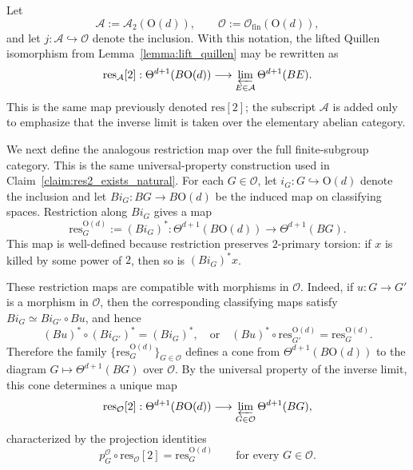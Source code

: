 \documentclass[aps,prx,reprint,superscriptaddress,twocolumn,amsmath,amssymb,amsfonts, nofootinbib]{revtex4-2}
\newcommand{\res}{\text{res}}
\theoremstyle{apsstyle}
\begin{document}
\noindent Let
\begin{equation}
\mathcal A:=\mathcal A_2(\mathrm{O}(d)), \qquad \mathcal O:=\mathcal O_{\mathrm{fin}}(\mathrm{O}(d)),
\end{equation}
and let $j:\mathcal A\hookrightarrow \mathcal O$ denote the inclusion. With this notation, the lifted Quillen isomorphism from Lemma~\ref{lemma:lift_quillen} may be rewritten as
\begin{equation}
\res_{\mathcal A}[2]: \Theta^{d+1}(B\mathrm{O}(d)) \longrightarrow \varprojlim_{E\in\mathcal A} \Theta^{d+1}(BE).
\end{equation}
This is the same map previously denoted $\res[2]$; the subscript $\mathcal A$ is added only to emphasize that the inverse limit is taken over the elementary abelian category.

\bigskip

We next define the analogous restriction map over the full finite-subgroup category. This is the same universal-property construction used in Claim~\ref{claim:res2_exists_natural}. For each $G\in\mathcal O$, let $i_G:G\hookrightarrow \mathrm{O}(d)$ denote the inclusion and let $Bi_G:BG\to B\mathrm{O}(d)$ be the induced map on classifying spaces. Restriction along $Bi_G$ gives a map
\begin{equation}
\res^{\mathrm{O}(d)}_{G}:=(Bi_G)^*: \Theta^{d+1}(B\mathrm{O}(d)) \longrightarrow \Theta^{d+1}(BG).
\end{equation}
This map is well-defined because restriction preserves $2$-primary torsion: if $x$ is killed by some power of $2$, then so is $(Bi_G)^*x$.

\noindent These restriction maps are compatible with morphisms in $\mathcal O$. Indeed, if $u:G\to G'$ is a morphism in $\mathcal O$, then the corresponding classifying maps satisfy $Bi_G\simeq Bi_{G'}\circ Bu$, and hence
\begin{equation}
(Bu)^*\circ (Bi_{G'})^*=(Bi_G)^*, \quad \text{or}\quad (Bu)^*\circ \res^{\mathrm{O}(d)}_{G'}=\res^{\mathrm{O}(d)}_{G}.
\end{equation}
Therefore the family $\{\res^{\mathrm{O}(d)}_{G}\}_{G\in\mathcal O}$ defines a cone from $\Theta^{d+1}(B\mathrm{O}(d))$ to the diagram $G\mapsto \Theta^{d+1}(BG)$ over $\mathcal O$. By the universal property of the inverse limit, this cone determines a unique map
\begin{equation}
\res_{\mathcal O}[2]:
\Theta^{d+1}(B\mathrm{O}(d)) 
\longrightarrow 
\varprojlim_{G\in\mathcal O}\Theta^{d+1}(BG),
\end{equation}
characterized by the projection identities
\begin{equation}
p_G^{\mathcal O}\circ \res_{\mathcal O}[2]=\res^{\mathrm{O}(d)}_{G}
\qquad
\text{for every }G\in\mathcal O.
\end{equation}
\end{document}
